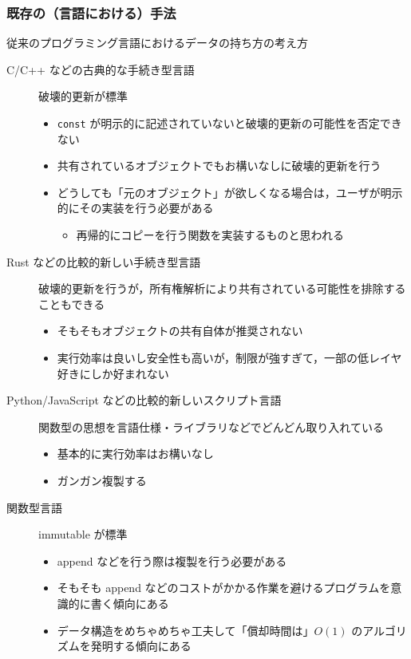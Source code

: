 \documentclass[10pt, a4j, twocolumn]{scrartcl}
\begin{document}
\subsubsection{既存の（言語における）手法}
\label{sec:org70725fb}

従来のプログラミング言語におけるデータの持ち方の考え方
\begin{description}
\item[{C/C++ などの古典的な手続き型言語}] 破壊的更新が標準
\begin{itemize}
\item \texttt{const} が明示的に記述されていないと破壊的更新の可能性を否定できない
\item 共有されているオブジェクトでもお構いなしに破壊的更新を行う
\item どうしても「元のオブジェクト」が欲しくなる場合は，ユーザが明示的にその実装を行う必要がある
\begin{itemize}
\item 再帰的にコピーを行う関数を実装するものと思われる
\end{itemize}
\end{itemize}
\item[{Rust などの比較的新しい手続き型言語}] 破壊的更新を行うが，所有権解析により共有されている可能性を排除することもできる
\begin{itemize}
\item そもそもオブジェクトの共有自体が推奨されない
\item 実行効率は良いし安全性も高いが，制限が強すぎて，一部の低レイヤ好きにしか好まれない
\end{itemize}
\item[{Python/JavaScript などの比較的新しいスクリプト言語}] 関数型の思想を言語仕様・ライブラリなどでどんどん取り入れている
\begin{itemize}
\item 基本的に実行効率はお構いなし
\item ガンガン複製する
\end{itemize}
\item[{関数型言語}] immutable が標準
\begin{itemize}
\item append などを行う際は複製を行う必要がある
\item そもそも append などのコストがかかる作業を避けるプログラムを意識的に書く傾向にある
\item データ構造をめちゃめちゃ工夫して「償却時間は」\(O(1)\) のアルゴリズムを発明する傾向にある
\begin{itemize}

\end{itemize}
\end{itemize}
\end{description}
\end{document}
